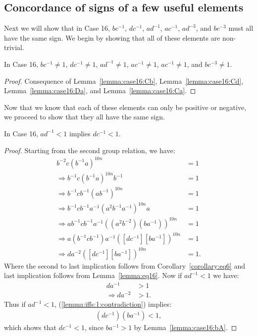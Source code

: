 \subsection{Concordance of signs of a few useful elements}

Next we will show that in Case 16, $bc^{-1}$, $dc^{-1}$, $ad^{-1}$, $ac^{-1}$, $ad^{-3}$, and $bc^{-3}$ must all have the same sign. We begin by showing that all of these elements are non-trivial.

\begin{proposition}
In Case 16, $bc^{-1}\neq1$, $dc^{-1}\neq1$, $ad^{-1}\neq1$, $ac^{-1}\neq1$, $ac^{-1}\neq1$, and $bc^{-3}\neq1$.
\end{proposition}
\begin{proof}
Consequence of Lemma~\ref{lemma:case16:Cb}, Lemma~\ref{lemma:case16:Cd},  Lemma~\ref{lemma:case16:Da}, and Lemma~\ref{lemma:case16:Ca}.
\end{proof}

\noindent{}Now that we know that each of these elements can only be positive or negative, we proceed to show that they all have the same sign.


\begin{lemma} In Case 16, $ad^{-1}<1$ implies $dc^{-1}<1$.
\label{lemma:iffs:1}
\end{lemma}
\begin{proof}
Starting from the second group relation, we have:
\begin{align}
b^{-2}c(b^{-1}a)^{10n}&=1\nonumber{}\\
\Rightarrow{}b^{-1}c(b^{-1}a)^{10n}b^{-1}&=1\nonumber{}\\
\Rightarrow{}b^{-1}cb^{-1}(ab^{-1})^{10n}&=1\nonumber{}\\
\Rightarrow{}b^{-1}cb^{-1}a^{-1}(a^{2}b^{-1}a^{-1})^{10n}a&=1\nonumber{}\\
\Rightarrow{}ab^{-1}cb^{-1}a^{-1}((a^{2}b^{-2})(ba^{-1}))^{10n}&=1\nonumber{}\\
\Rightarrow{}a(b^{-1}cb^{-1})a^{-1}([dc^{-1}][ba^{-1}])^{10n}&=1\nonumber{}\\
\Rightarrow{}da^{-2}([dc^{-1}][ba^{-1}])^{10n}&=1.\label{lemma:iffs:1:contradiction}
\end{align}
Where the second to last implication follows from Corollary~\ref{corollary:eq6} and last implication follows from Lemma~\ref{lemma:eq16}. Now if $ad^{-1}<1$ we have:
\begin{align*}
da^{-1}&>1\\
\Rightarrow{}da^{-2}&>1.
\end{align*}
Thus if $ad^{-1}<1$, (\ref{lemma:iffs:1:contradiction}) implies:
\begin{align*}
(dc^{-1})(ba^{-1})<1,
\end{align*}
which shows that $dc^{-1}<1$, since $ba^{-1}>1$ by Lemma~\ref{lemma:case16:bA}.
\end{proof}

